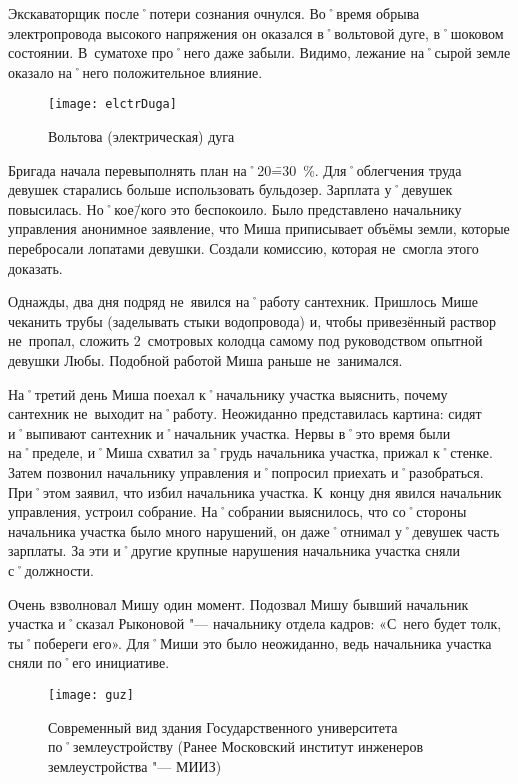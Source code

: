 Экскаваторщик после˚потери сознания очнулся. Во˚время обрыва электропровода высокого напряжения он оказался в˚вольтовой дуге, в˚шоковом состоянии. В~суматохе про˚него даже забыли. Видимо, лежание на˚сырой земле оказало на˚него положительное влияние. 

\begin{wrapfigure}{O}{.4\textwidth}
\centering
\texttt{[image: elctrDuga]}
\caption{Вольтова (электрическая) дуга}
\label{fig:elctrDuga}
\end{wrapfigure}

Бригада начала перевыполнять план на˚20\==30~\%. Для˚облегчения труда девушек старались больше использовать бульдозер. Зарплата у˚девушек повысилась. Но˚кое\=/кого это беспокоило. Было представлено начальнику управления анонимное заявление, что Миша приписывает объёмы земли, которые перебросали лопатами девушки. Создали комиссию, которая не~смогла этого доказать.

Однажды, два дня подряд не~явился на˚работу сантехник. Пришлось Мише чеканить трубы (заделывать стыки водопровода) и, чтобы привезённый раствор не~пропал, сложить 2~смотровых колодца самому под руководством опытной девушки Любы. Подобной работой Миша раньше не~занимался.

На˚третий день Миша поехал к˚начальнику участка выяснить, почему сантехник не~выходит на˚работу. Неожиданно представилась картина: сидят и˚выпивают сантехник и˚начальник участка. Нервы в˚это время были на˚пределе, и˚Миша схватил за˚грудь начальника участка, прижал к˚стенке. Затем позвонил начальнику управления и˚попросил приехать и˚разобраться. При˚этом заявил, что избил начальника участка. К~концу дня явился начальник управления, устроил собрание. На˚собрании выяснилось, что со˚стороны начальника участка было много нарушений, он даже˚отнимал у˚девушек часть зарплаты. За эти и˚другие крупные нарушения начальника участка сняли с˚должности. 

Очень взволновал Мишу один момент. Подозвал Мишу бывший начальник участка и˚сказал Рыконовой "--- начальнику отдела кадров: «С~него будет толк, ты˚побереги его». Для˚Миши это было неожиданно, ведь начальника участка сняли по˚его инициативе. 

\begin{wrapfigure}{O}{.4\textwidth}
\centering
\texttt{[image: guz]}
\caption[Современный вид здания Государственного университета по˚землеустройству (Ранее Московский институт инженеров землеустройства "--- МИИЗ)]{Современный вид здания Государственного университета по˚землеустройству (Ранее Московский институт инженеров землеустройства "--- МИИЗ)\footnotemark}
\label{fig:guz}
\end{wrapfigure}

